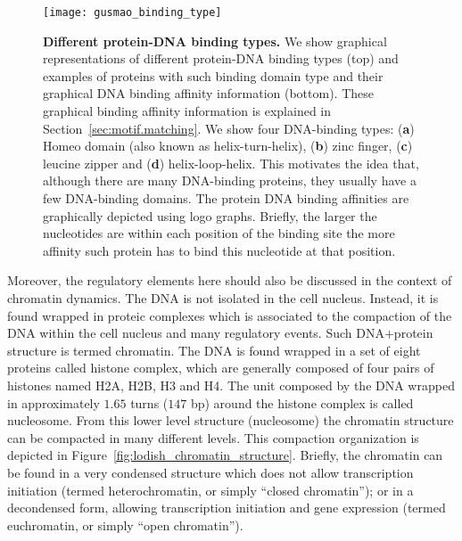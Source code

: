 \begin{figure}[h!]
\centering
\texttt{[image: gusmao\_binding\_type]}
\caption[Different protein-DNA binding types]{\textbf{Different protein-DNA binding types.} We show graphical representations of different protein-DNA binding types (top) and examples of proteins with such binding domain type and their graphical DNA binding affinity information (bottom). These graphical binding affinity information is explained in Section~\ref{sec:motif.matching}. We show four DNA-binding types: (\textbf{a}) Homeo domain (also known as helix-turn-helix), (\textbf{b}) zinc finger, (\textbf{c}) leucine zipper and (\textbf{d}) helix-loop-helix. This motivates the idea that, although there are many DNA-binding proteins, they usually have a few DNA-binding domains. The protein DNA binding affinities are graphically depicted using logo graphs. Briefly, the larger the nucleotides are within each position of the binding site the more affinity such protein has to bind this nucleotide at that position.}
\label{fig:gusmao_binding_type}
\end{figure}

Moreover, the regulatory elements here should also be discussed in the context of chromatin dynamics. The DNA is not isolated in the cell nucleus. Instead, it is found wrapped in proteic complexes which is associated to the compaction of the DNA within the cell nucleus and many regulatory events. Such DNA$+$protein structure is termed chromatin. The DNA is found wrapped in a set of eight proteins called histone complex, which are generally composed of four pairs of histones named H2A, H2B, H3 and H4. The unit composed by the DNA wrapped in approximately $1.65$ turns (\approxy$147$ bp) around the histone complex is called nucleosome. From this lower level structure (nucleosome) the chromatin structure can be compacted in many different levels. This compaction organization is depicted in Figure~\ref{fig:lodish_chromatin_structure}. Briefly, the chromatin can be found in a very condensed structure which does not allow transcription initiation (termed heterochromatin, or simply ``closed chromatin''); or in a decondensed form, allowing transcription initiation and gene expression (termed euchromatin, or simply ``open chromatin'').

